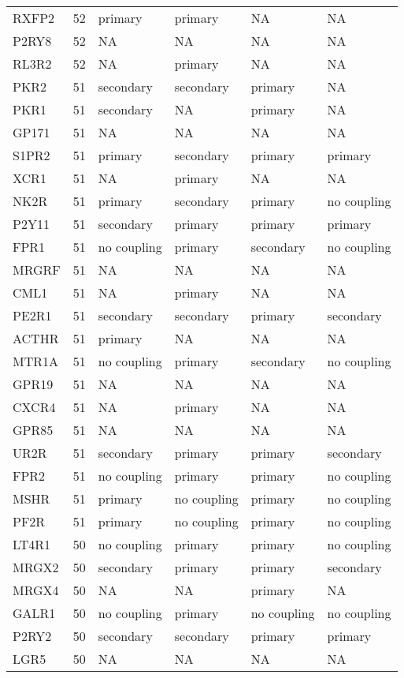 \begin{longtable}{lrllll}
RXFP2 & 52 & primary & primary & NA & NA\\
\addlinespace
P2RY8 & 52 & NA & NA & NA & NA\\
RL3R2 & 52 & NA & primary & NA & NA\\
PKR2 & 51 & secondary & secondary & primary & NA\\
PKR1 & 51 & secondary & NA & primary & NA\\
GP171 & 51 & NA & NA & NA & NA\\
\addlinespace
S1PR2 & 51 & primary & secondary & primary & primary\\
XCR1 & 51 & NA & primary & NA & NA\\
NK2R & 51 & primary & secondary & primary & no coupling\\
P2Y11 & 51 & secondary & primary & primary & primary\\
FPR1 & 51 & no coupling & primary & secondary & no coupling\\
\addlinespace
MRGRF & 51 & NA & NA & NA & NA\\
CML1 & 51 & NA & primary & NA & NA\\
PE2R1 & 51 & secondary & secondary & primary & secondary\\
ACTHR & 51 & primary & NA & NA & NA\\
MTR1A & 51 & no coupling & primary & secondary & no coupling\\
\addlinespace
GPR19 & 51 & NA & NA & NA & NA\\
CXCR4 & 51 & NA & primary & NA & NA\\
GPR85 & 51 & NA & NA & NA & NA\\
UR2R & 51 & secondary & primary & primary & secondary\\
FPR2 & 51 & no coupling & primary & primary & no coupling\\
\addlinespace
MSHR & 51 & primary & no coupling & primary & no coupling\\
PF2R & 51 & primary & no coupling & primary & no coupling\\
LT4R1 & 50 & no coupling & primary & primary & no coupling\\
MRGX2 & 50 & secondary & primary & primary & secondary\\
MRGX4 & 50 & NA & NA & primary & NA\\
\addlinespace
GALR1 & 50 & no coupling & primary & no coupling & no coupling\\
P2RY2 & 50 & secondary & secondary & primary & primary\\
LGR5 & 50 & NA & NA & NA & NA\\

\end{longtable}
